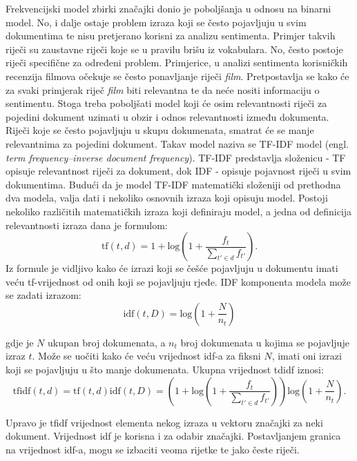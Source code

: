 \documentclass[times, utf8, zavrsni, numeric]{fer}
\begin{document}
\par Frekvencijski model zbirki značajki donio je poboljšanja u odnosu na binarni model.
No, i dalje ostaje problem izraza koji se često pojavljuju u svim dokumentima te nisu pretjerano korisni
za analizu sentimenta. 
Primjer takvih riječi su zaustavne riječi koje se u pravilu brišu iz vokabulara.
No, često postoje riječi specifične za određeni problem. 
Primjerice, u analizi sentimenta korisničkih recenzija filmova očekuje se često ponavljanje riječi 
\textit{film}. 
Pretpostavlja se kako će za svaki primjerak riječ \textit{film} biti relevantna te da neće nositi 
informaciju o sentimentu.
Stoga treba poboljšati model koji će osim relevantnosti riječi za pojedini dokument uzimati u obzir
i odnos relevantnosti između dokumenta.
Riječi koje se često pojavljuju u skupu dokumenata, smatrat će se manje relevantnima za pojedini dokument.
Takav model naziva se TF-IDF model (engl. \textit{term frequency–inverse document frequency}).
TF-IDF predstavlja složenicu - TF opisuje relevantnost riječi za dokument, dok IDF - opisuje pojavnost riječi
u svim dokumentima.
Budući da je model TF-IDF matematički složeniji od prethodna dva modela, valja dati i nekoliko 
osnovnih izraza koji opisuju model.
Postoji nekoliko različitih matematičkih izraza koji definiraju model, a jedna od definicija 
relevantnosti izraza dana je formulom:
\begin{equation}
  \text{tf}(t, d) = 1 + \text{log}(1+ \frac{f_t}{\sum_{t' \in d}f_{t'}}).
\end{equation}
Iz formule je vidljivo kako će izrazi koji se češće pojavljuju u dokumentu imati veću tf-vrijednost od
onih koji se pojavljuju rjeđe.
IDF komponenta modela može se zadati izrazom:
\begin{equation}
  \text{idf}(t, D) = \text{log}(1 + \frac{N}{n_t})
\end{equation}

gdje je $N$ ukupan broj dokumenata, a $n_t$ broj dokumenata u kojima se pojavljuje izraz $t$.
Može se uočiti kako će veću vrijednost idf-a za fiksni $N$, imati oni izrazi koji se pojavljuju u što
manje dokumenata. Ukupna vrijednost tdidf iznosi:
\begin{equation}
  \text{tfidf}(t, d) = \text{tf}(t, d)\text{idf}(t, D) = 
  (1 + \text{log}(1+ \frac{f_t}{\sum_{t' \in d}f_{t'}}))\text{log}(1 + \frac{N}{n_t}).
\end{equation}

Upravo je tfidf vrijednost elementa nekog izraza u vektoru značajki za neki dokument.
Vrijednost idf je korisna i za odabir značajki. Postavljanjem granica na vrijednost idf-a, mogu se
izbaciti veoma rijetke te jako česte riječi.
\end{document}
